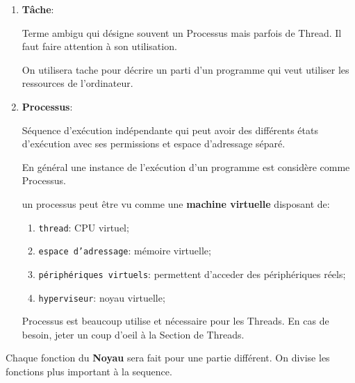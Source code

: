 \documentclass{article}
\begin{document}
\begin{enumerate}[rightmargin = \leftmargin]
    \item \textbf{Tâche}:
    \begin{definition}\label{def:tache}
        Terme ambigu qui désigne souvent un Processus mais parfois de Thread. Il faut faire attention à son utilisation.
    \end{definition}
    On utilisera tache pour décrire un parti d'un programme qui veut utiliser les ressources de l'ordinateur.
    
    \item \textbf{Processus}:
    \begin{definition}\label{def:processus}
        Séquence d'exécution indépendante qui peut avoir des différents états d'exécution avec ses permissions et espace d'adressage séparé.

        \begin{remark}
            En général une instance de l'exécution d'un programme est considère comme Processus.
        \end{remark}

        \begin{phrase}
            un processus peut être vu comme une \textbf{machine virtuelle} disposant de:
            \begin{enumerate}[noitemsep]
                \item \texttt{thread}: CPU virtuel;
                \item \texttt{espace d'adressage}: mémoire virtuelle;
                \item \texttt{périphériques virtuels}: permettent d'acceder des périphériques réels;
                \item \texttt{hyperviseur}: noyau virtuelle;
            \end{enumerate}
        \end{phrase}
    \end{definition}
    Processus est beaucoup utilise et nécessaire pour les Threads. En cas de besoin, jeter un coup d'oeil à la Section de Threads. 
\end{enumerate}
Chaque fonction du \textbf{Noyau} sera fait pour une partie différent. On divise les fonctions plus important à la sequence.
\end{document}
